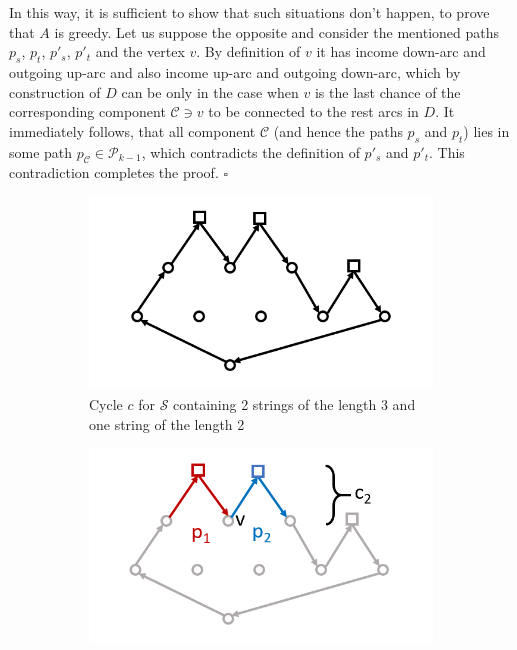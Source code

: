 \documentclass[11pt]{article}
\begin{document}
	In this way, it is sufficient to show that such situations don't happen, to prove that $A$ is greedy. Let us suppose the opposite and consider the mentioned paths $p_s$, $p_t$, $p'_s$, $p'_t$ and the vertex $v$. By definition of $v$ it has income down-arc and outgoing up-arc and also income up-arc and outgoing down-arc, which by construction of $D$ can be only in the case when $v$ is the last chance of the corresponding component $\mathcal{C} \ni v$ to be connected to the rest arcs in $D$. It immediately follows, that all component $\mathcal{C}$ (and hence the paths  $p_s$ and $p_t$) lies in some path $p_{\mathcal{C}} \in \mathcal{P}_{k-1}$, which contradicts the definition of $p'_s$ and $p'_t$. This contradiction completes the proof. $\square$
	
	\begin{figure}[h]
		\centering
		\begin{subfigure}[t]{0.3\textwidth}
			\includegraphics[width=\textwidth]{gha_is_greedy_img/fig1.png}
			\caption{Cycle $c$ for $\mathcal{S}$ containing 2 strings of the length 3 and one string of the length 2}
			\label{fig:1a}
		\end{subfigure}
		\hfil
		\begin{subfigure}[t]{0.3\textwidth}
			\includegraphics[width=\textwidth]{gha_is_greedy_img/fig2.png}

\end{subfigure}
\end{figure}
\end{document}
